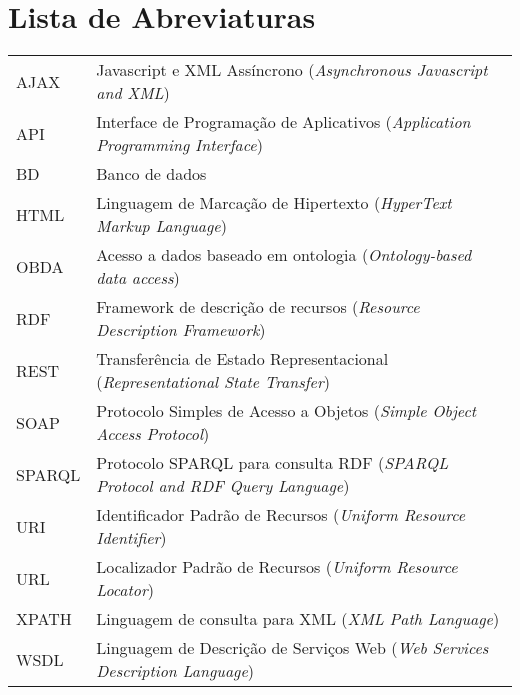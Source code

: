 \chapter{Lista de Abreviaturas}
\begin{tabular}{ll}
        AJAX         & Javascript e XML Assíncrono (\emph{Asynchronous Javascript and XML})\\
         API         & Interface de Programação de Aplicativos (\emph{Application Programming Interface})\\
          BD         & Banco de dados\\
        HTML         & Linguagem de Marcação de Hipertexto (\emph{HyperText Markup Language})\\
        OBDA         & Acesso a dados baseado em ontologia (\emph{Ontology-based data access})\\
         RDF         & Framework de descrição de recursos (\emph{Resource Description Framework})\\
        REST         & Transferência de Estado Representacional (\emph{Representational State Transfer})\\
        SOAP         & Protocolo Simples de Acesso a Objetos (\emph{Simple Object Access Protocol})\\
      SPARQL         & Protocolo SPARQL para consulta RDF (\emph{SPARQL Protocol and RDF Query Language})\\
         URI         & Identificador Padrão de Recursos (\emph{Uniform Resource Identifier})\\
         URL         & Localizador Padrão de Recursos (\emph{Uniform Resource Locator})\\
       XPATH         & Linguagem de consulta para XML (\emph{XML Path Language})\\
        WSDL         & Linguagem de Descrição de Serviços Web (\emph{Web Services Description Language})\\
\end{tabular}